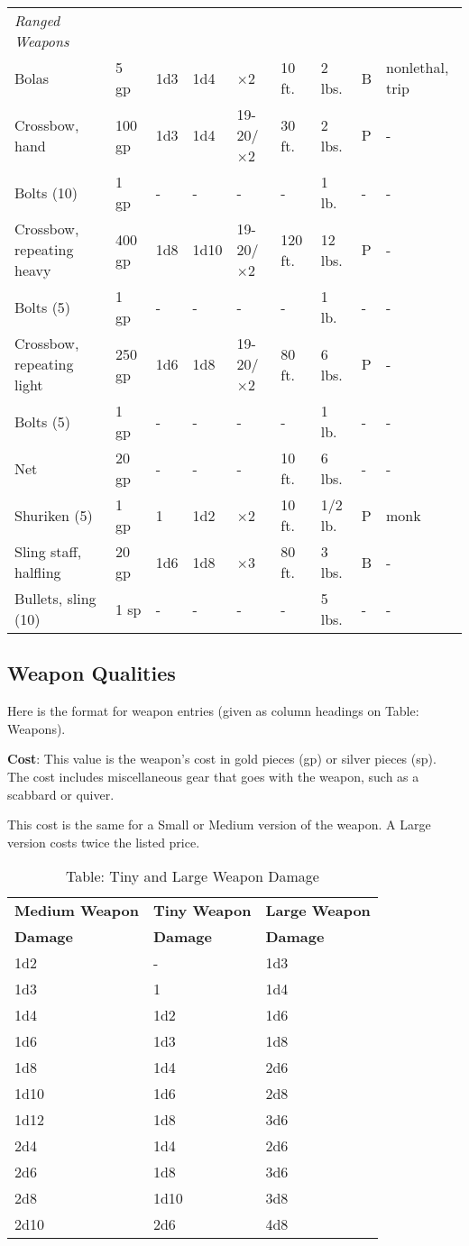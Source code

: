 \begin{table*}[]
\begin{tabular}{lllllllll}
 \textit{Ranged Weapons} \\
 Bolas & 5 gp & 1d3 & 1d4 & $\times$2 & 10 ft. & 2 lbs. & B & nonlethal, trip \\
 Crossbow, hand & 100 gp & 1d3 & 1d4 & 19-20/$\times$2 & 30 ft. & 2 lbs. & P & - \\
 Bolts (10) & 1 gp & - & - & - & - & 1 lb. & - & - \\
 Crossbow, repeating heavy & 400 gp & 1d8 & 1d10 & 19-20/$\times$2 & 120 ft. & 12 lbs. & P & - \\
 Bolts (5) & 1 gp & - & - & - & - & 1 lb. & - & - \\
 Crossbow, repeating light & 250 gp & 1d6 & 1d8 & 19-20/$\times$2 & 80 ft. & 6 lbs. & P & - \\
 Bolts (5) & 1 gp & - & - & - & - & 1 lb. & - & - \\
 Net & 20 gp & - & - & - & 10 ft. & 6 lbs. & - & - \\
 Shuriken (5) & 1 gp & 1 & 1d2 & $\times$2 & 10 ft. & 1/2 lb. & P & monk \\
 Sling staff, halfling & 20 gp & 1d6 & 1d8 & $\times$3 & 80 ft. & 3 lbs. & B & - \\
 Bullets, sling (10) & 1 sp & - & - & - & - & 5 lbs. & - & -\\
\end{tabular}
\end{table*}

\subsection{Weapon Qualities}

Here is the format for weapon entries (given as column headings on Table: Weapons).
		
\textbf{Cost}: This value is the weapon's cost in gold pieces (gp) or silver pieces (sp). The cost includes miscellaneous gear that goes with the weapon, such as a scabbard or quiver.
		
This cost is the same for a Small or Medium version of the weapon. A Large version costs twice the listed price.
		

\begin{table}[]
\sffamily
\caption{Table: Tiny and Large Weapon Damage}
\begin{tabular}{lll}
\textbf{Medium Weapon} & \textbf{Tiny Weapon} & \textbf{Large Weapon} \\
\textbf{Damage} & \textbf{Damage} & \textbf{Damage}\\
1d2& -& 1d3 \\
1d3& 1& 1d4 \\
1d4& 1d2& 1d6 \\
1d6& 1d3& 1d8 \\
1d8& 1d4& 2d6 \\
1d10& 1d6& 2d8 \\
1d12& 1d8& 3d6 \\
2d4& 1d4& 2d6 \\
2d6& 1d8& 3d6 \\
2d8& 1d10& 3d8 \\
2d10& 2d6& 4d8\\
\end{tabular}
\end{table}
		
